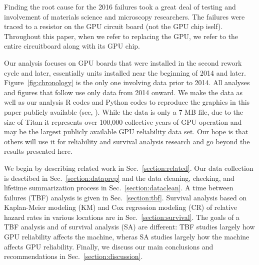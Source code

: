 Finding the root cause for the 2016 failures took a great deal of
testing and involvement of materials science and microscopy
researchers. The failures were traced to a resistor on the GPU
circuit board (not the GPU chip iself). Throughout this paper, when we
refer to replacing the GPU, we refer to the entire circuitboard along
with its GPU chip.

Our analysis focuses on GPU boards that were installed in the second
rework cycle and later, essentially units installed near the beginning
of 2014 and later. Figure~\ref{fig:chronology} is the only one
involving data prior to 2014. All analyses and figures that follow use
only data from 2014 onward. We make the data as well as our analysis R
codes and Python codes to reproduce the graphics in this paper
publicly available (see, \cite[repository to be added in final
version]{repositoryreference,rcodes,pycodes}).  While the data is only
a 7 MB file, due to the size of Titan it represents over 100,000
collective years of GPU operation and may be the largest publicly
available GPU reliability data set. Our hope is that others will use
it for reliability and survival analysis research and go beyond the
results presented here.

We begin by describing related work in Sec.~\ref{section:related}. Our
data collection is desctibed in Sec.~\ref{section:dataprep} and the
data cleaning, checking, and lifetime summarization process in
Sec.~\ref{section:dataclean}. A time between failures (TBF) analysis
is given in Sec.~\ref{section:tbf}. Survival analysis based on
Kaplan-Meier modeling (KM) and Cox regression modeling (CR) of
relative hazard rates in various locations are in
Sec.~\ref{section:survival}. The goals of a TBF analysis and of
survival analysis (SA) are different: TBF studies largely how GPU
reliability affects the machine, wheras SA studies largely how the
machine affects GPU reliability.  Finally, we discuss our main
conclusions and recommendations in Sec.~\ref{section:discussion}.
 


